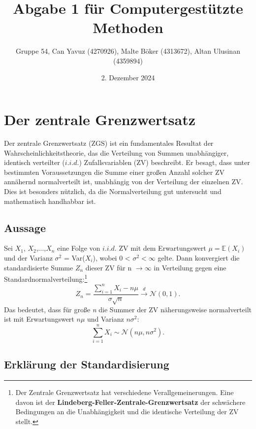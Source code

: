 \documentclass{article}
\title{Abgabe 1 für Computergestützte Methoden}
\author{Gruppe 54, Can Yavuz (4270926), Malte Böker (4313672), Altan Ulusinan (4359894)}
\date{2. Dezember 2024 }
\begin{document}
\maketitle
\tableofcontents
\newpage

\section{Der zentrale Grenzwertsatz}

Der zentrale Grenzwertsatz (ZGS) ist ein fundamentales Resultat der Wahrscheinlichkeitstheorie, das die Verteilung von Summen unabhängiger, identisch verteilter ($i.i.d.$) Zufallsvariablen (ZV) beschreibt. Er besagt, dass unter bestimmten Voraussetzungen die Summe einer großen Anzahl solcher ZV annähernd normalverteilt ist, unabhängig von der Verteilung der einzelnen ZV. Dies ist besonders nützlich, da die Normalverteilung gut untersucht und mathematisch handhabbar ist.



\subsection{Aussage}

Sei \( X_1 \), \( X_2 \),...,\( X_n \) eine Folge von $i.i.d.$ ZV mit dem Erwartungswert $\mu = \mathbb{E}(X_i)$ und der Varianz $\sigma^2$ = Var($X_i$), wobei 0 < $\sigma^2 < \infty$ gelte. Dann konvergiert die standardisierte Summe \( Z_n \) dieser ZV für n $\to \infty$ in Verteilung gegen eine Standardnormalverteilung:\footnote{Der Zentrale Grenzwertsatz hat verschiedene Verallgemeinerungen. Eine davon ist der \textbf{Lindeberg-Feller-Zentrale-Grenzwertsatz}\cite[Seite 328]{Wahrscheinlichkeitstheorie} der schwächere Bedingungen an die Unabhängigkeit und die identische Verteilung der ZV stellt.}
\begin{equation}
\label{eq:zn}
 Z_n = \frac{\sum_{i=1}^n X_i - \textit{n}\mu}{\sigma\sqrt{n}}\overset{d}{\longrightarrow} \mathcal{N}(0,1).
\end{equation}
Das bedeutet, dass für große \textit{n} die Summer der ZV näherungsweise normalverteilt ist mit Erwartungswert $\textit{n} \mu$ und Varianz $\textit{n}\sigma^2$:
\begin{equation}
\label{eq:sum}
    \sum_{i=1}^n X_i \sim \mathcal{N}(\textit{n}\mu, \textit{n}\sigma^2).
\end{equation}

\subsection{Erklärung der Standardisierung}
\end{document}
